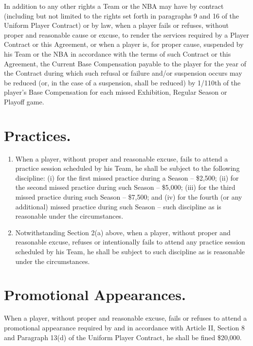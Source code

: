 \documentclass[
]{book}
\providecommand{\tightlist}{%
  \setlength{\itemsep}{0pt}\setlength{\parskip}{0pt}}
\begin{document}
In addition to any other rights a Team or the NBA may have by contract (including but not limited to the rights set forth in paragraphs 9 and 16 of the Uniform Player Contract) or by law, when a player fails or refuses, without proper and reasonable cause or excuse, to render the services required by a Player Contract or this Agreement, or when a player is, for proper cause, suspended by his Team or the NBA in accordance with the terms of such Contract or this Agreement, the Current Base Compensation payable to the player for the year of the Contract during which such refusal or failure and/or suspension occurs may be reduced (or, in the case of a suspension, shall be reduced) by 1/110th of the player's Base Compensation for each missed Exhibition, Regular Season or Playoff game.

\hypertarget{practices.}{%
\section{Practices.}\label{practices.}}

\begin{enumerate}
\def\labelenumi{(\alph{enumi})}
\tightlist
\item
  When a player, without proper and reasonable excuse, fails to attend a practice session scheduled by his Team, he shall be subject to the following discipline: (i) for the first missed practice during a Season -- \$2,500; (ii) for the second missed practice during such Season -- \$5,000; (iii) for the third missed practice during such Season -- \$7,500; and (iv) for the fourth (or any additional) missed practice during such Season -- such discipline as is reasonable under the circumstances.
\item
  Notwithstanding Section 2(a) above, when a player, without proper and reasonable excuse, refuses or intentionally fails to attend any practice session scheduled by his Team, he shall be subject to such discipline as is reasonable under the circumstances.
\end{enumerate}

\hypertarget{promotional-appearances.}{%
\section{Promotional Appearances.}\label{promotional-appearances.}}

When a player, without proper and reasonable excuse, fails or refuses to attend a promotional appearance required by and in accordance with Article II, Section 8 and Paragraph 13(d) of the Uniform Player Contract, he shall be fined \$20,000.
\end{document}
